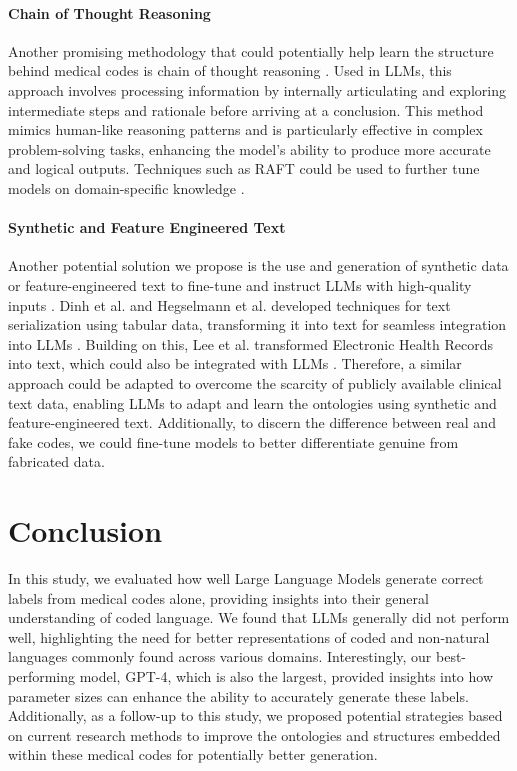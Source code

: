 \documentclass[11pt]{article}
\theoremstyle{plain}
\theoremstyle{definition}
\theoremstyle{remark}
\begin{document}
\paragraph{Chain of Thought Reasoning}

Another promising methodology that could potentially help learn the structure behind medical codes is chain of thought reasoning \cite{wei2022chain}. Used in LLMs, this approach involves processing information by internally articulating and exploring intermediate steps and rationale before arriving at a conclusion. This method mimics human-like reasoning patterns and is particularly effective in complex problem-solving tasks, enhancing the model's ability to produce more accurate and logical outputs. Techniques such as RAFT could be used to further tune models on domain-specific knowledge \cite{zhang2024raft}.

\paragraph{Synthetic and Feature Engineered Text}

Another potential solution we propose is the use and generation of synthetic data or feature-engineered text to fine-tune and instruct LLMs with high-quality inputs \cite{li2023synthetic, wang2023improving}. Dinh et al. and Hegselmann et al. developed techniques for text serialization using tabular data, transforming it into text for seamless integration into LLMs \cite{hegselmann2023tabllm, dinh2022lift}. Building on this, Lee et al. transformed Electronic Health Records into text, which could also be integrated with LLMs \cite{lee2024emergency}. Therefore, a similar approach could be adapted to overcome the scarcity of publicly available clinical text data, enabling LLMs to adapt and learn the ontologies using synthetic and feature-engineered text. Additionally, to discern the difference between real and fake codes, we could fine-tune models to better differentiate genuine from fabricated data.

\section{Conclusion}

In this study, we evaluated how well Large Language Models generate correct labels from medical codes alone, providing insights into their general understanding of coded language. We found that LLMs generally did not perform well, highlighting the need for better representations of coded and non-natural languages commonly found across various domains. Interestingly, our best-performing model, GPT-4, which is also the largest, provided insights into how parameter sizes can enhance the ability to accurately generate these labels. Additionally, as a follow-up to this study, we proposed potential strategies based on current research methods to improve the ontologies and structures embedded within these medical codes for potentially better generation.
\end{document}
